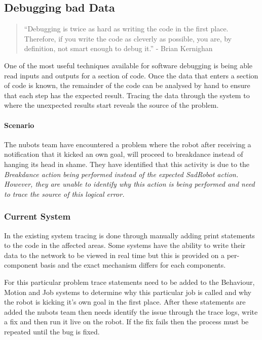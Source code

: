 \documentclass[english,12pt]{scrartcl}
\begin{document}
		\subsection{Debugging bad Data}
			\begin{quote}``Debugging is twice as hard as writing the code in the first place. Therefore, if you write the code as cleverly as possible, you are, by definition, not smart enough to debug it.'' - Brian Kernighan\end{quote}
			One of the most useful techniques available for software debugging is being able read inputs and outputs for a section of code. Once the data that enters a section
			of code is known, the remainder of the code can be analysed by hand to ensure that each
			step has the expected result. Tracing the data through the system to where the unexpected results start reveals the source of the problem.

			\paragraph{Scenario} The \gls{nubots} team have encountered a problem where the robot after
			receiving a notification that it kicked an own goal, will proceed to breakdance instead
			of hanging its head in shame. They have identified that this activity is due to the
			\em{Breakdance} action being performed instead of the expected \em{SadRobot} action. However, they are unable to identify why this action is being performed and need to trace the source
			of this logical error.

			\subsubsection{Current System}
				In the existing system tracing is done through manually adding print statements to the code in the affected areas.
				Some systems have the ability to write their data to the network to be viewed in real time but this is provided on a per-component basis and the exact mechanism differs for each components.
				
				For this particular problem trace statements need to be added to the Behaviour, Motion and Job systems to determine why this particular job is called and why the robot is kicking it's own goal in the first place.
				After these statements are added the \gls{nubots} team then needs identify the issue through the trace logs, write a fix and then run it live on the robot.
				If the fix fails then the process must be repeated until the bug is fixed.
				
\end{document}

